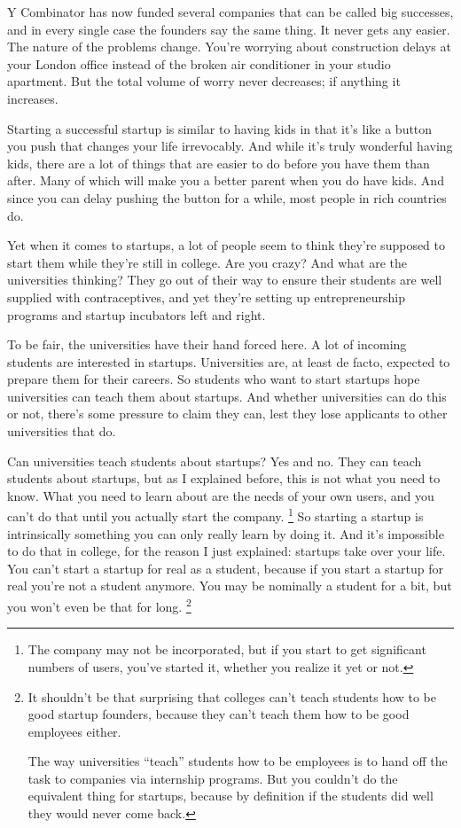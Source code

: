 \documentclass[12pt]{book}
\begin{document}
Y Combinator has now funded several companies that can be called big
successes, and in every single case the founders say the same thing. It
never gets any easier. The nature of the problems change. You're
worrying about construction delays at your London office instead of the
broken air conditioner in your studio apartment. But the total volume of
worry never decreases; if anything it increases.

Starting a successful startup is similar to having kids in that it's
like a button you push that changes your life irrevocably. And while
it's truly wonderful having kids, there are a lot of things that are
easier to do before you have them than after. Many of which will make
you a better parent when you do have kids. And since you can delay
pushing the button for a while, most people in rich countries do.

Yet when it comes to startups, a lot of people seem to think they're
supposed to start them while they're still in college. Are you crazy?
And what are the universities thinking? They go out of their way to
ensure their students are well supplied with contraceptives, and yet
they're setting up entrepreneurship programs and startup incubators left
and right.

To be fair, the universities have their hand forced here. A lot of
incoming students are interested in startups. Universities are, at least
de facto, expected to prepare them for their careers. So students who
want to start startups hope universities can teach them about startups.
And whether universities can do this or not, there's some pressure to
claim they can, lest they lose applicants to other universities that do.

Can universities teach students about startups? Yes and no. They can
teach students about startups, but as I explained before, this is not
what you need to know. What you need to learn about are the needs of
your own users, and you can't do that until you actually start the
company. \footnote{The company may not be incorporated, but if you start to get
significant numbers of users, you've started it, whether you realize it
yet or not.} So starting a startup is intrinsically
something you can only really learn by doing it. And it's impossible to
do that in college, for the reason I just explained: startups take over
your life. You can't start a startup for real as a student, because if
you start a startup for real you're not a student anymore. You may be
nominally a student for a bit, but you won't even be that for long.
\footnote{It shouldn't be that surprising that colleges can't teach
students how to be good startup founders, because they can't teach them
how to be good employees either.

The way universities ``teach'' students how to be employees is to hand
off the task to companies via internship programs. But you couldn't do
the equivalent thing for startups, because by definition if the students
did well they would never come back.}
\end{document}
